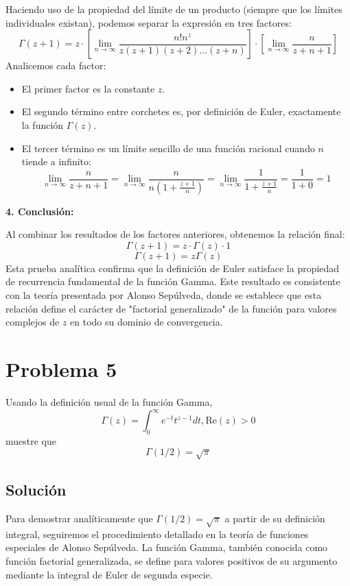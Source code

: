 \documentclass[a4paper]{article}
\begin{document}
Haciendo uso de la propiedad del límite de un producto (siempre que los límites individuales existan), podemos separar la expresión en tres factores:
$$ \Gamma(z+1) = z \cdot \left[ \lim_{n\to\infty} \frac{n! n^z}{z(z+1)(z+2)...(z+n)} \right] \cdot \left[ \lim_{n\to\infty} \frac{n}{z+n+1} \right] $$
Analicemos cada factor:
\begin{itemize}
    \item El primer factor es la constante $z.$
    \item El segundo término entre corchetes es, por definición de Euler, exactamente la función $\Gamma(z).$
    \item El tercer término es un límite sencillo de una función racional cuando $n$ tiende a infinito:
    $$ \lim_{n\to\infty} \frac{n}{z+n+1} = \lim_{n\to\infty} \frac{n}{n \left( 1 + \frac{z+1}{n} \right)} = \lim_{n\to\infty} \frac{1}{1 + \frac{z+1}{n}} = \frac{1}{1 + 0} = 1 $$
\end{itemize}

\textbf{4. Conclusión:}

Al combinar los resultados de los factores anteriores, obtenemos la relación final:
$$ \Gamma(z+1) = z \cdot \Gamma(z) \cdot 1 $$
$$ \Gamma(z+1) = z \Gamma(z) $$
Esta prueba analítica confirma que la definición de Euler satisface la propiedad de recurrencia fundamental de la función Gamma. Este resultado es consistente con la teoría presentada por Alonso Sepúlveda, donde se establece que esta relación define el carácter de "factorial generalizado" de la función para valores complejos de $z$ en todo su dominio de convergencia.


\section{Problema 5}
Usando la definición usual de la función Gamma,
$$ \Gamma(z) = \int_{0}^{\infty} e^{-t} t^{z-1} dt , \text{Re}(z) > 0 $$
muestre que $$ \Gamma(1/2) = \sqrt{\pi} $$

\subsection{Solución}

Para demostrar analíticamente que $\Gamma(1/2) = \sqrt{\pi}$ a partir de su definición integral, seguiremos el procedimiento detallado en la teoría de funciones especiales de Alonso Sepúlveda. La función Gamma, también conocida como función factorial generalizada, se define para valores positivos de su argumento mediante la integral de Euler de segunda especie.
\end{document}

